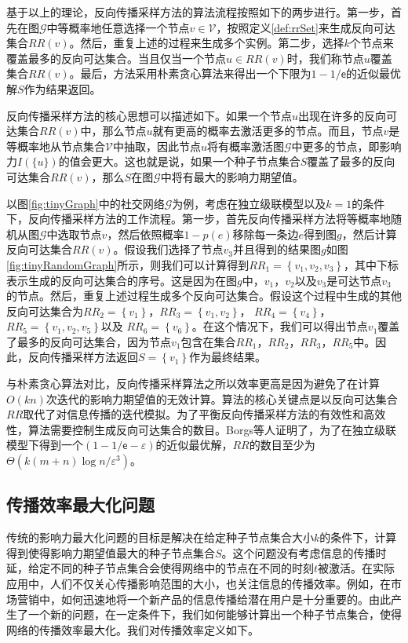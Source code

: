 基于以上的理论，反向传播采样方法的算法流程按照如下的两步进行。第一步，首先在图$\mathcal{G}$中等概率地任意选择一个节点$v \in \mathcal{V}$，按照定义\ref{def:rrSet}来生成反向可达集合${RR}\left(v\right)$。然后，重复上述的过程来生成多个实例。第二步，选择$k$个节点来覆盖最多的反向可达集合。当且仅当一个节点$u\in RR\left(v\right)$时，我们称节点$u$覆盖集合$RR\left(v\right)$。最后，方法采用朴素贪心算法来得出一个下限为$1-1/\mathsf{e}$的近似最优解$S$作为结果返回。

反向传播采样方法的核心思想可以描述如下。如果一个节点$u$出现在许多的反向可达集合$RR\left(v\right)$中，那么节点$u$就有更高的概率去激活更多的节点。而且，节点$v$是等概率地从节点集合$\mathcal{V}$中抽取，因此节点$u$将有概率激活图$\mathcal{G}$中更多的节点，即影响力$I\left(\{u\}\right)$的值会更大。这也就是说，如果一个种子节点集合$S$覆盖了最多的反向可达集合$RR\left(v\right)$，那么$S$在图$\mathcal{G}$中将有最大的影响力期望值。

以图\ref{fig:tinyGraph}中的社交网络$\mathcal{G}$为例，考虑在独立级联模型以及$k=1$的条件下，反向传播采样方法的工作流程。第一步，首先反向传播采样方法将等概率地随机从图$\mathcal{G}$中选取节点$v$，然后依照概率$1-p\left(e\right)$移除每一条边$e$得到图$g$，然后计算反向可达集合$RR\left(v\right)$。假设我们选择了节点$v_3$并且得到的结果图$g$如图\ref{fig:tinyRandomGraph}所示，则我们可以计算得到${RR}_1=\left\{v_1, v_2, v_3\right\}$，其中下标表示生成的反向可达集合的序号。这是因为在图$g$中，$v_1$，$v_2$以及$v_3$是可达节点$v_3$的节点。然后，重复上述过程生成多个反向可达集合。假设这个过程中生成的其他反向可达集合为${RR}_2=\left\{v_1\right\}$，${RR}_3=\left\{v_1, v_2\right\}$， ${RR}_4=\left\{v_4\right\}$，${RR}_5=\left\{v_1, v_2, v_5\right\}$以及 ${RR}_6=\left\{v_6\right\}$。在这个情况下，我们可以得出节点$v_1$覆盖了最多的反向可达集合，因为节点$v_1$包含在集合${RR}_1$，${RR}_2$，${RR}_3$，${RR}_5$中。因此，反向传播采样方法返回$S=\left\{v_1\right\}$作为最终结果。

与朴素贪心算法对比，反向传播采样算法之所以效率更高是因为避免了在计算$O\left(kn\right)$次迭代的影响力期望值的无效计算。算法的核心关键点是以反向可达集合$RR$取代了对信息传播的迭代模拟。为了平衡反向传播采样方法的有效性和高效性，算法需要控制生成反向可达集合的数目。Borgs等人证明了，为了在独立级联模型下得到一个$\left(1-1/\mathsf{e}-\varepsilon\right)$的近似最优解，$RR$的数目至少为$\Theta\left(k\left(m+n\right)\log{n}/\varepsilon^3\right)$。

\subsection{传播效率最大化问题}
\label{3subsec:efficiency}
传统的影响力最大化问题的目标是解决在给定种子节点集合大小$k$的条件下，计算得到使得影响力期望值最大的种子节点集合$S$。这个问题没有考虑信息的传播时延，给定不同的种子节点集合会使得网络中的节点在不同的时刻$t$被激活。在实际应用中，人们不仅关心传播影响范围的大小，也关注信息的传播效率。例如，在市场营销中，如何迅速地将一个新产品的信息传播给潜在用户是十分重要的。由此产生了一个新的问题，在一定条件下，我们如何能够计算出一个种子节点集合，使得网络的传播效率最大化。我们对传播效率定义如下。

